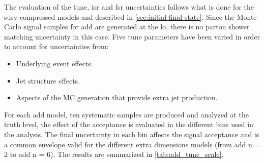 The evaluation of the tune, \gls{isr} and \gls{fsr} uncertainties follows what
is done for the \gls{susy} compressed models and described in
\cref{sec:initial-final-state}. Since the Monte Carlo signal samples for
\gls{add} are generated at the \gls{lo}, there is no parton shower matching
uncertainty in this case. Five tune parameters have been varied in order to
account for uncertainties from:
\begin{itemize}
\item Underlying event effects.
\item Jet structure effects.
\item Aspects of the MC generation that provide extra jet production.
\end{itemize}
For each \gls{add} model, ten systematic samples are produced and analyzed at
the truth level, the effect of the acceptance is evaluated in the different bins
used in the analysis. The final uncertainty in each bin affects the signal
acceptance and is a common envelope valid for the different extra dimensions
models (from \gls{add} n = 2 to \gls{add} n = 6). The results are summarized in
\cref{tab:add_tune_scale}.
\begin{table}[!ht]
  \centering
  \caption{Tune, initial and final state radiation uncertainties in \% on the
    acceptance of the different signal region $\met$ bins in the analysis. The
    final value is a common envelope valid for all the \gls{add} models between n = 2
    and n = 6 dimensions.}
  \label{tab:add_tune_scale}
\end{table}
